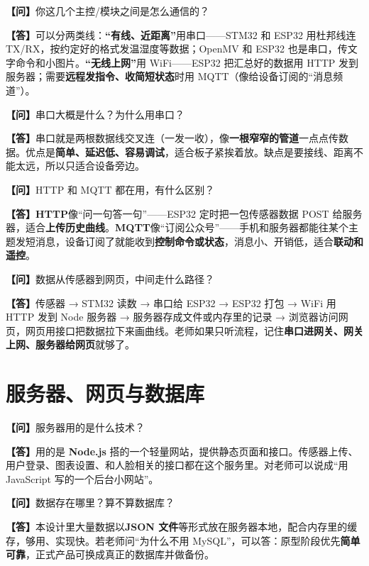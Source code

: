 \documentclass[11pt,a4paper]{ctexart}
\newcommand{\答辩问}[1]{\par\noindent\textbf{\color{QColor}【问】}#1\par\vspace{0.35em}}
\newcommand{\答辩答}[1]{\noindent\textbf{【答】}#1\par}
\begin{document}
\begin{qabox}
\答辩问{你这几个主控/模块之间是怎么通信的？}
\答辩答{可以分两类线：\textbf{``有线、近距离''}用串口——STM32 和 ESP32 用杜邦线连 TX/RX，按约定好的格式发温湿度等数据；OpenMV 和 ESP32 也是串口，传文字命令和小图片。\textbf{``无线上网''}用 WiFi——ESP32 把汇总好的数据用 HTTP 发到服务器；需要\textbf{远程发指令、收简短状态}时用 MQTT（像给设备订阅的``消息频道''）。}
\end{qabox}

\begin{qabox}
\答辩问{串口大概是什么？为什么用串口？}
\答辩答{串口就是两根数据线交叉连（一发一收），像\textbf{一根窄窄的管道}一点点传数据。优点是\textbf{简单、延迟低、容易调试}，适合板子紧挨着放。缺点是要接线、距离不能太远，所以只适合设备旁边。}
\end{qabox}

\begin{qabox}
\答辩问{HTTP 和 MQTT 都在用，有什么区别？}
\答辩答{\textbf{HTTP}像``问一句答一句''——ESP32 定时把一包传感器数据 POST 给服务器，适合\textbf{上传历史曲线}。\textbf{MQTT}像``订阅公众号''——手机和服务器都能往某个主题发短消息，设备订阅了就能收到\textbf{控制命令或状态}，消息小、开销低，适合\textbf{联动和遥控}。}
\end{qabox}

\begin{qabox}
\答辩问{数据从传感器到网页，中间走什么路径？}
\答辩答{传感器 → STM32 读数 → 串口给 ESP32 → ESP32 打包 → WiFi 用 HTTP 发到 Node 服务器 → 服务器存成文件或内存里的记录 → 浏览器访问网页，网页用接口把数据拉下来画曲线。老师如果只听流程，记住\textbf{串口进网关、网关上网、服务器给网页}就够了。}
\end{qabox}

\section{服务器、网页与数据库}

\begin{qabox}
\答辩问{服务器用的是什么技术？}
\答辩答{用的是 \textbf{Node.js} 搭的一个轻量网站，提供静态页面和接口。传感器上传、用户登录、图表设置、和人脸相关的接口都在这个服务里。对老师可以说成``用 JavaScript 写的一个后台小网站''。}
\end{qabox}

\begin{qabox}
\答辩问{数据存在哪里？算不算数据库？}
\答辩答{本设计里大量数据以\textbf{JSON 文件}等形式放在服务器本地，配合内存里的缓存，够用、实现快。若老师问``为什么不用 MySQL''，可以答：原型阶段优先\textbf{简单可靠}，正式产品可换成真正的数据库并做备份。}
\end{qabox}
\end{document}
